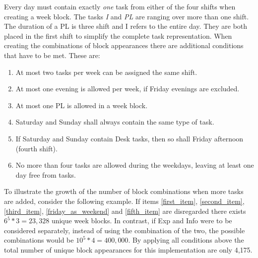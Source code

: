 Every day must contain exactly \textit{one} task from either of the four shifts when creating a week block. The tasks \textit{I} and \textit{PL} are ranging over more than one shift. The duration of a PL is three shift and I refers to the entire day. They are both placed in the first shift to simplify the complete task representation. When creating the combinations of block appearances there are additional conditions that have to be met. These are:
\begin{enumerate}  
\item At most two tasks per week can be assigned the same shift.\label{first_item}
\item At most one evening is allowed per week, if Friday evenings are excluded. \label{second_item}
\item At most one PL is allowed in a week block. \label{third_item}
\item Saturday and Sunday shall always contain the same type of task.\label{fourth_item}
\item If Saturday and Sunday contain Desk tasks, then so shall Friday afternoon (fourth shift). \label{friday_as_weekend}
\item No more than four tasks are allowed during the weekdays, leaving at least one day free from tasks. \label{fifth_item}
\end{enumerate}

To illustrate the growth of the number of block combinations when more tasks are added, consider the following example. If items \ref{first_item}, \ref{second_item}, \ref{third_item}, \ref{friday_as_weekend} and \ref{fifth_item} are disregarded there exists $6^5*3 = 23,328$ unique week blocks. In contrast, if Exp and Info were to be considered separately, instead of using the combination of the two, the possible combinations would be $10^5*4 = 400,000$.  By applying all conditions above the total number of unique block appearances for this implementation are only 4,175. 


